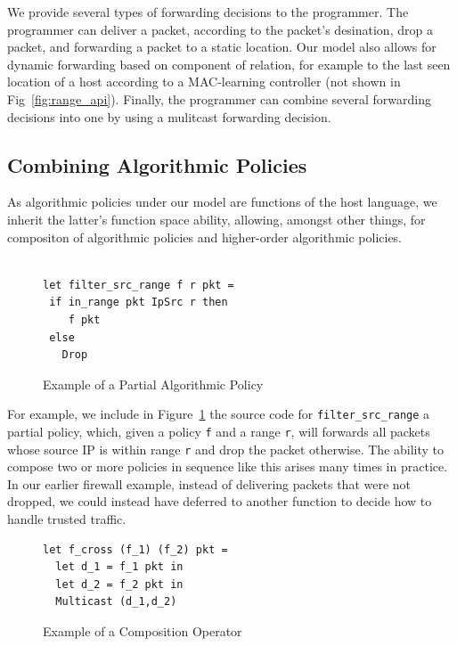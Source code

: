 \documentclass[preprint]{sigplanconf}
\begin{document}
   We provide several types of forwarding decisions to the programmer. The programmer can deliver a packet, according to the packet's desination, drop a packet, and forwarding a packet to a static location. Our model also allows for dynamic forwarding based on component of relation, for example to the last seen location of a host according to a MAC-learning controller (not shown in Fig~\ref{fig:range_api}). Finally, the programmer can combine several forwarding decisions into one by using a mulitcast forwarding decision.
   

   \subsection*{Combining Algorithmic Policies}
   As algorithmic policies under our model are functions of the host language, we inherit the latter's function space ability, allowing, amongst other things, for compositon of algorithmic policies and higher-order algorithmic policies.

\begin{figure}[ht]
\begin{lstlisting}

let filter_src_range f r pkt =
 if in_range pkt IpSrc r then
    f pkt
 else
   Drop   
\end{lstlisting}

\caption{Example of a Partial Algorithmic Policy}
\label{fig:ex-hole}
\end{figure}

   
   For example, we include in Figure~\ref{fig:ex-hole} the source code for \lstinline|filter_src_range| a partial policy, which, given a policy \lstinline|f| and a range \lstinline|r|, will forwards all packets whose source IP is within range \lstinline|r| and drop the packet otherwise. The ability to compose two or more policies in sequence like this arises many times in practice. In our earlier firewall example, instead of delivering packets that were not dropped, we could instead have deferred to another function to decide how to handle trusted traffic.


   \begin{figure}[ht]
\begin{lstlisting}
let f_cross (f_1) (f_2) pkt =
  let d_1 = f_1 pkt in
  let d_2 = f_2 pkt in
  Multicast (d_1,d_2)
\end{lstlisting}

\caption{Example of a Composition Operator}
\label{fig:ex-cross}
\end{figure}
   
\end{document}
